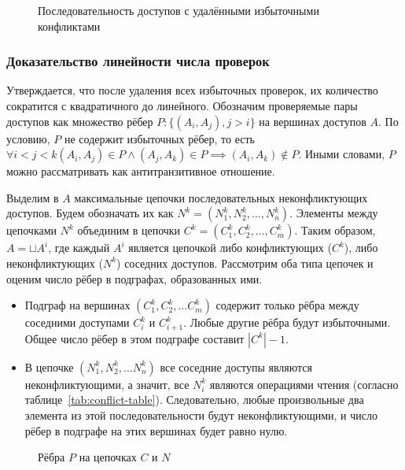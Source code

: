 \begin{figure}[H]
    \centering
    
    \caption{Последовательность доступов с удалёнными избыточными конфликтами}
    \label{fig:stripped-conflicts}
\end{figure}

\subsubsection{Доказательство линейности числа проверок}

Утверждается, что после удаления всех избыточных проверок, их количество сократится с квадратичного до линейного. Обозначим проверяемые пары доступов как множество рёбер $P:\{(A_i, A_j), j>i\}$ на вершинах доступов $A$. По условию, $P$ не содержит избыточных рёбер, то есть $\forall i < j < k (A_i, A_j) \in P \wedge (A_j, A_k) \in P \implies (A_i, A_k) \notin P$. Иными словами, $P$ можно рассматривать как антитранзитивное отношение.

Выделим в $A$ максимальные цепочки последовательных неконфликтующих доступов. Будем обозначать их как $N^k = (N^k_1, N^k_2, \ldots, N^k_n)$. Элементы между цепочками $N^k$ объединим в цепочки $C^k = (C^k_1, C^k_2, \ldots, C^k_m)$. Таким образом, $A = \sqcup A^i$, где каждый $A^i$ является цепочкой либо конфликтующих ($C^k$), либо неконфликтующих ($N^k$) соседних доступов. Рассмотрим оба типа цепочек и оценим число рёбер в подграфах, образованных ими.

\begin{itemize}
    \item Подграф на вершинах $(C^k_1, C^k_2, \dots C^k_m)$ содержит только рёбра между соседними доступами $C^k_i$ и $C^k_{i+1}$. Любые другие рёбра будут избыточными. Общее число рёбер в этом подграфе составит $|C^k| - 1$.
    \item В цепочке $(N^k_1, N^k_2, \dots N^k_n)$ все соседние доступы являются неконфликтующими, а значит, все $N^k_i$ являются операциями чтения (согласно таблице~\ref{tab:conflict-table}). Следовательно, любые произвольные два элемента из этой последовательности будут неконфликтующими, и число рёбер в подграфе на этих вершинах будет равно нулю.
\end{itemize}

\begin{figure}[H]
    \centering
    
    \caption{Рёбра $P$ на цепочках $C$ и $N$}
    \label{fig:cn-chains}
\end{figure}

